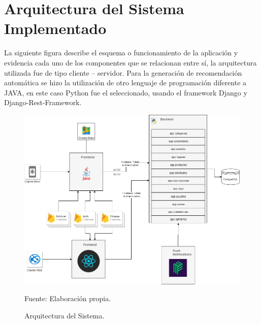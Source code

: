 \documentclass[12pt,letterpaper,openany]{book}
\begin{document}
\section{Arquitectura del Sistema Implementado}
La siguiente figura describe el esquema o funcionamiento de la aplicación y evidencia cada uno de los componentes que se relacionan entre sí, la arquitectura utilizada fue de tipo cliente – servidor. Para la generación de recomendación automática se hizo la utilización de otro lenguaje de programación diferente a JAVA, en este caso Python fue el seleccionado, usando el framework Django y Django-Rest-Framework.
\begin{figure}[H]
\begin{center}
\includegraphics[width=13cm]{./imagenes/arquitectura}
\caption{Arquitectura del Sistema.}
\centering Fuente: Elaboración propia.
\end{center}
\end{figure}
\end{document}
